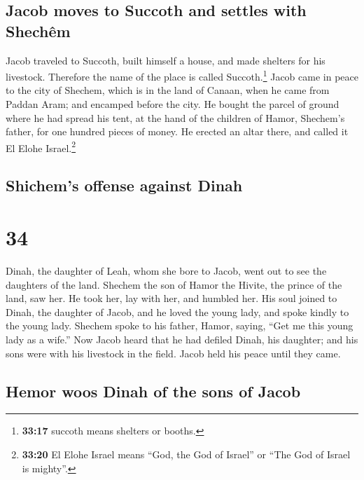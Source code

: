 \hypertarget{jacob-moves-to-succoth-and-settles-with-shechuxeam}{%
\subsection{Jacob moves to Succoth and settles with
Shechêm}\label{jacob-moves-to-succoth-and-settles-with-shechuxeam}}

 Jacob traveled to Succoth, built himself a house, and
made shelters for his livestock. Therefore the name of the place is
called Succoth.\footnote{\textbf{33:17} succoth means shelters or
  booths.}  Jacob came in peace to the city of Shechem,
which is in the land of Canaan, when he came from Paddan Aram; and
encamped before the city.  He bought the parcel of ground
where he had spread his tent, at the hand of the children of Hamor,
Shechem's father, for one hundred pieces of money.  He
erected an altar there, and called it El Elohe Israel.\footnote{\textbf{33:20}
  El Elohe Israel means ``God, the God of Israel'' or ``The God of
  Israel is mighty''.}

\hypertarget{shichems-offense-against-dinah}{%
\subsection{Shichem's offense against
Dinah}\label{shichems-offense-against-dinah}}

\hypertarget{section-33}{%
\section{34}\label{section-33}}

 Dinah, the daughter of Leah, whom she bore to Jacob, went
out to see the daughters of the land.  Shechem the son of
Hamor the Hivite, the prince of the land, saw her. He took her, lay with
her, and humbled her.  His soul joined to Dinah, the
daughter of Jacob, and he loved the young lady, and spoke kindly to the
young lady.  Shechem spoke to his father, Hamor, saying,
``Get me this young lady as a wife.''  Now Jacob heard
that he had defiled Dinah, his daughter; and his sons were with his
livestock in the field. Jacob held his peace until they came.

\hypertarget{hemor-woos-dinah-of-the-sons-of-jacob}{%
\subsection{Hemor woos Dinah of the sons of
Jacob}\label{hemor-woos-dinah-of-the-sons-of-jacob}}

